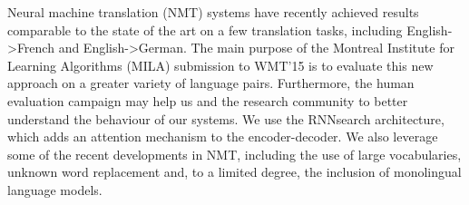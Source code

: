 Neural machine translation (NMT) systems have recently achieved results comparable to the state of the art on a few translation tasks, including English->French and English->German. The main purpose of the Montreal Institute for Learning Algorithms (MILA) submission to WMT'15 is to evaluate this new approach on a greater variety of language pairs. Furthermore, the human evaluation campaign may help us and the research community to better understand the behaviour of our systems. We use the RNNsearch architecture, which adds an attention mechanism to the encoder-decoder. We also leverage some of the recent developments in NMT, including the use of large vocabularies, unknown word replacement and, to a limited degree, the inclusion of monolingual language models.
